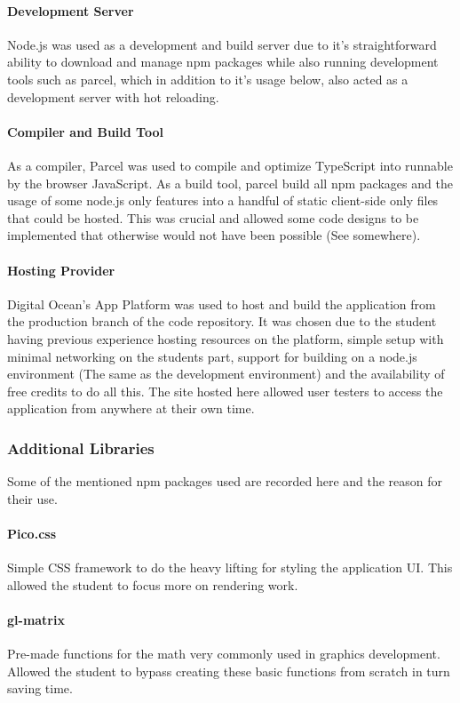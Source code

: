 \paragraph{Development Server}
Node.js was used as a development and build server due to it's straightforward ability to download and manage npm packages while also running development tools such as parcel, which in addition to it's usage below, also acted as a development server with hot reloading.

\paragraph{Compiler and Build Tool}
As a compiler, Parcel was used to compile and optimize TypeScript into runnable by the browser JavaScript. As a build tool, parcel build all npm packages and the usage of some node.js only features into a handful of static client-side only files that could be hosted. This was crucial and allowed some code designs to be implemented that otherwise would not have been possible (See somewhere).

\paragraph{Hosting Provider}
Digital Ocean's App Platform was used to host and build the application from the production branch of the code repository. It was chosen due to the student having previous experience hosting resources on the platform, simple setup with minimal networking on the students part, support for building on a node.js environment (The same as the development environment) and the availability of free credits to do all this. The site hosted here allowed user testers to access the application from anywhere at their own time.

\subsubsection{Additional Libraries}
Some of the mentioned npm packages used are recorded here and the reason for their use.

\paragraph{Pico.css}
Simple CSS framework to do the heavy lifting for styling the application UI. This allowed the student to focus more on rendering work.

\paragraph{gl-matrix}
Pre-made functions for the math very commonly used in graphics development. Allowed the student to bypass creating these basic functions from scratch in turn saving time.

